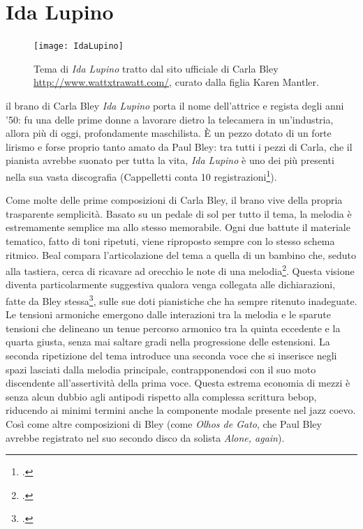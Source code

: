 \section{Ida Lupino}
\begin{figure}[h]
	\centering
	\texttt{[image: IdaLupino]}
	\caption{Tema di \textit{Ida Lupino} tratto dal sito ufficiale di Carla Bley \url{http://www.wattxtrawatt.com/}, curato dalla figlia Karen Mantler.}
	\label{idatheme}
\end{figure}
il brano di Carla Bley \textit{Ida Lupino} porta il nome dell'attrice e regista degli anni '50: fu una delle prime donne a lavorare dietro la telecamera in un'industria, allora più di oggi, profondamente maschilista. È un pezzo dotato di un forte lirismo e forse proprio tanto amato da Paul Bley: tra tutti i pezzi di Carla, che il pianista avrebbe suonato per tutta la vita, \textit{Ida Lupino} è uno dei più presenti nella sua vasta discografia (Cappelletti conta 10 registrazioni\footcite[121]{cappelletti}).\par
Come molte delle prime composizioni di Carla Bley, il brano vive della propria trasparente semplicità. Basato su un pedale di sol per tutto il tema, la melodia è estremamente semplice ma allo stesso memorabile. Ogni due battute il materiale tematico, fatto di toni ripetuti, viene riproposto sempre con lo stesso schema ritmico. Beal compara l'articolazione del tema a quella di un bambino che, seduto alla tastiera, cerca di ricavare ad orecchio le note di una melodia\footcite[25]{carla}. Questa visione diventa particolarmente suggestiva qualora venga collegata alle dichiarazioni, fatte da Bley stessa\footcite[25]{carla}, sulle sue doti pianistiche che ha sempre ritenuto inadeguate. Le tensioni armoniche emergono dalle interazioni tra la melodia e le sparute tensioni che delineano un tenue percorso armonico tra la quinta eccedente e la quarta giusta, senza mai saltare gradi nella progressione delle estensioni. La seconda ripetizione del tema introduce una seconda voce che si inserisce negli spazi lasciati dalla melodia principale, contrapponendosi con il suo moto discendente all'assertività della prima voce. Questa estrema economia di mezzi è senza alcun dubbio agli antipodi rispetto alla complessa scrittura bebop, riducendo ai minimi termini anche la componente modale presente nel jazz coevo. Così come altre composizioni di Bley (come \textit{Olhos de Gato}, che Paul Bley avrebbe registrato nel suo secondo disco da solista \textit{Alone, again}).\par

